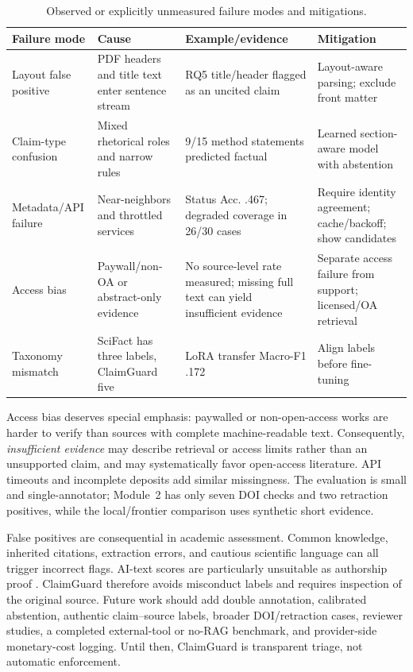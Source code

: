 \documentclass[12pt,toc=bib,toc=listof]{scrartcl}
\begin{document}
\begin{table}[H]
\centering
\scriptsize
\setlength{\tabcolsep}{3pt}
\begin{tabularx}{\textwidth}{@{}P{2.25cm}P{3cm}YP{3.2cm}@{}}
\toprule
\textbf{Failure mode} & \textbf{Cause} & \textbf{Example/evidence} & \textbf{Mitigation} \\
\midrule
Layout false positive & PDF headers and title text enter sentence stream & RQ5 title/header flagged as an uncited claim & Layout-aware parsing; exclude front matter \\
Claim-type confusion & Mixed rhetorical roles and narrow rules & 9/15 method statements predicted factual & Learned section-aware model with abstention \\
Metadata/API failure & Near-neighbors and throttled services & Status Acc. .467; degraded coverage in 26/30 cases & Require identity agreement; cache/backoff; show candidates \\
Access bias & Paywall/non-OA or abstract-only evidence & No source-level rate measured; missing full text can yield insufficient evidence & Separate access failure from support; licensed/OA retrieval \\
Taxonomy mismatch & SciFact has three labels, ClaimGuard five & LoRA transfer Macro-F1 .172 & Align labels before fine-tuning \\
\bottomrule
\end{tabularx}
\caption{Observed or explicitly unmeasured failure modes and mitigations.}
\label{tab:failure_modes}
\end{table}

Access bias deserves special emphasis: paywalled or non-open-access works are harder to verify than sources with complete machine-readable text. Consequently, \emph{insufficient evidence} may describe retrieval or access limits rather than an unsupported claim, and may systematically favor open-access literature. API timeouts and incomplete deposits add similar missingness. The evaluation is small and single-annotator; Module~2 has only seven DOI checks and two retraction positives, while the local/frontier comparison uses synthetic short evidence.

False positives are consequential in academic assessment. Common knowledge, inherited citations, extraction errors, and cautious scientific language can all trigger incorrect flags. AI-text scores are particularly unsuitable as authorship proof \cite{sadasivan2023,weberwulff2023}. ClaimGuard therefore avoids misconduct labels and requires inspection of the original source. Future work should add double annotation, calibrated abstention, authentic claim--source labels, broader DOI/retraction cases, reviewer studies, a completed external-tool or no-RAG benchmark, and provider-side monetary-cost logging. Until then, ClaimGuard is transparent triage, not automatic enforcement.
\end{document}
